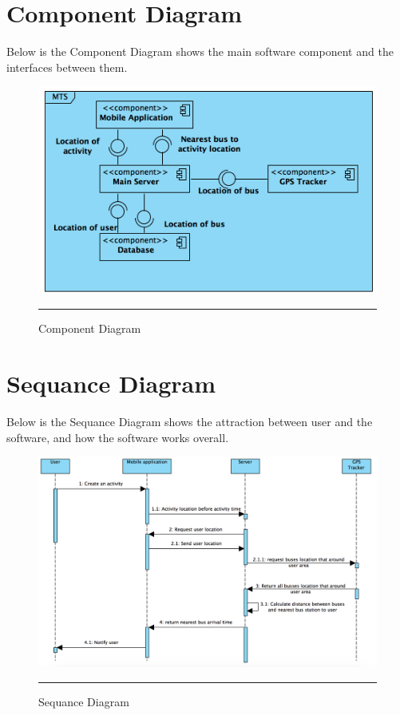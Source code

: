 \section{Component Diagram}
Below is the Component Diagram shows the main software component and the interfaces between them.
\begin{figure}[H]
	\centering
	\includegraphics[scale=0.8]{Figures/FigureComponentDiagram.png}
	\rule{35em}{0.5pt}
	\caption[Component Diagram]{Component Diagram}
\end{figure}

\pagebreak
\section{Sequance Diagram}
Below is the Sequance Diagram shows the attraction between user and the software, and how the software works overall.

\begin{figure}[H]
	\centering
	\includegraphics[scale=0.5]{Figures/FugreSequanceDiagram.png}
	\rule{35em}{0.5pt}
	\caption[Sequance Diagram]{Sequance Diagram}
\end{figure}
